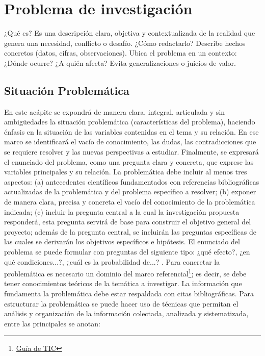 

\clearpage
\section{Problema de investigación}
¿Qué es?
Es una descripción clara, objetiva y contextualizada de la realidad que genera una necesidad, conflicto o desafío.
¿Cómo redactarlo?
Describe hechos concretos (datos, cifras, observaciones).
Ubica el problema en un contexto: ¿Dónde ocurre? ¿A quién afecta?
Evita generalizaciones o juicios de valor.

\subsection{Situación Problemática}
En este acápite se expondrá de manera clara, integral, articulada y sin ambigüedades la situación problemática (características del problema), haciendo énfasis en la situación de las variables contenidas en el tema y su relación. En ese marco se identificará el vacío de conocimiento, las dudas, las contradicciones que se requiere resolver y las nuevas perspectivas a estudiar.
Finalmente, se expresará el enunciado del problema, como una pregunta clara y concreta, que exprese las variables principales y su relación. La problemática debe incluir al menos tres aspectos: (a) antecedentes científicos fundamentados con referencias bibliográficas actualizadas de la problemática y del problema específico a resolver; (b) exponer de manera clara, precisa y concreta el vacío del conocimiento de la problemática indicada; (c) incluir la pregunta central a la cual la investigación propuesta responderá, esta pregunta servirá de base para construir el objetivo general del proyecto; además de la pregunta central, se incluirán las preguntas específicas de las cuales se derivarán los objetivos específicos e hipótesis. El enunciado del problema se puede formular con preguntas del siguiente tipo: ¿qué efecto?, ¿en qué condiciones...?, ¿cuál es la probabilidad de...? .
Para concretar la problemática es necesario un dominio del marco referencial\footnote{\href{https://unl.edu.ec/investigacion/guias-investigacion}{Guía de TIC}}; es decir, se debe tener conocimientos teóricos de la temática a investigar. La información que fundamenta la problemática debe estar respaldada con citas bibliográficas. Para estructurar la problemática se puede hacer uso de técnicas que permitan el análisis y organización de la información colectada, analizada y sistematizada, entre las principales se anotan:

